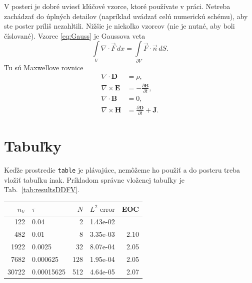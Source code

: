 \documentclass[portrait,a0]{a0poster}
\begin{document}
\begin{multicols}{3}
	V posteri je dobré uviesť kľúčové vzorce, ktoré používate v práci. Netreba zachádzať do úplných detailov (napríklad uvádzať celú numerickú schému), aby ste poster príliš nezahltili. Nižšie je niekoľko vzorcov (nie je nutné, aby boli číslované). Vzorec \eqref{eq:Gauss} je Gaussova veta
	\begin{equation}\label{eq:Gauss}
		\int\limits_{V} \nabla\cdot\vec{F}\,dx = \int\limits_{\partial V} \vec{F}\cdot\vec{n}\,dS.
	\end{equation}
	Tu sú Maxwellove rovnice
	\begin{subequations}
		\label{eq:Maxwell}
		\begin{align}
			\nabla\cdot\mathbf{D}  & =\rho,    \label{eq:Maxwell_1}                                               \\
			\nabla\times\mathbf{E} & = -\frac{\partial \mathbf{B}}{\partial t},  \label{eq:Maxwell_2}             \\
			\nabla\cdot\mathbf{B}  & =0,    \label{eq:Maxwell_3}                                                  \\
			\nabla\times\mathbf{H} & = \frac{\partial \mathbf{D}}{\partial t} + \mathbf{J}.  \label{eq:Maxwell_4}
		\end{align}
	\end{subequations}
	
	
	\section*{Tabuľky}
	
	Keďže prostredie \verb|table| je plávajúce, nemôžeme ho použiť a do posteru treba vložiť tabuľku inak. Príkladom správne vloženej tabuľky je Tab.~\ref{tab:resultsDDFV}.
	
	\begin{center}
		\begin{tabular}{rlrrr}
			\hline
			$n_V$ & $\tau$     & $N$ & $ L^2\mbox{ error}$ &  EOC \\ \hline
			122 & 0.04       &   2 &            1.43e-02 &      \\
			482 & 0.01       &   8 &            3.35e-03 & 2.10 \\
			1922 & 0.0025     &  32 &            8.07e-04 & 2.05 \\
			7682 & 0.000625   & 128 &            1.95e-04 & 2.05 \\
			30722 & 0.00015625 & 512 &            4.64e-05 & 2.07 \\ \hline
		\end{tabular}
		\label{tab:resultsDDFV}
	\end{center}
	

\end{multicols}
\end{document}
